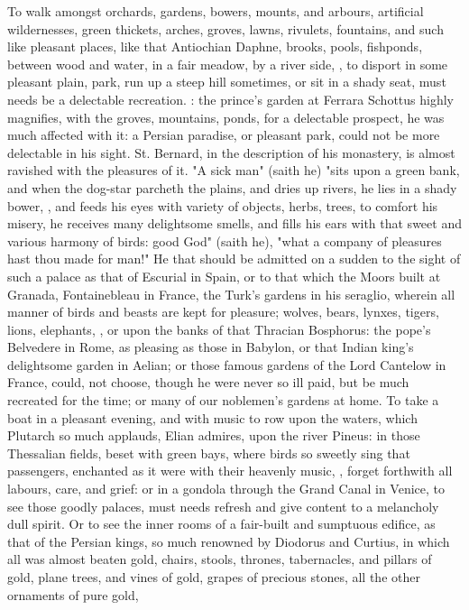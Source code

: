 {To walk amongst orchards, gardens, bowers, mounts, and arbours, artificial wildernesses, green thickets, arches, groves, lawns, rivulets, fountains, and such like pleasant places, like that Antiochian Daphne, brooks, pools, fishponds, between wood and water, in a fair meadow, by a river side, , \etc{} to disport in some pleasant plain, park, run up a steep hill sometimes, or sit in a shady seat, must needs be a delectable recreation. : the prince's garden at Ferrara Schottus highly magnifies, with the groves, mountains, ponds, for a delectable prospect, he was much affected with it: a Persian paradise, or pleasant park, could not be more delectable in his sight. St. Bernard, in the description of his monastery, is almost ravished with the pleasures of it. "A sick man" (saith he) "sits upon a green bank, and when the dog-star parcheth the plains, and dries up rivers, he lies in a shady bower, , and feeds his eyes with variety of objects, herbs, trees, to comfort his misery, he receives many delightsome smells, and fills his ears with that sweet and various harmony of birds: good God" (saith he), "what a company of pleasures hast thou made for man!" He that should be admitted on a sudden to the sight of such a palace as that of Escurial in Spain, or to that which the Moors built at Granada, Fontainebleau in France, the Turk's gardens in his seraglio, wherein all manner of birds and beasts are kept for pleasure; wolves, bears, lynxes, tigers, lions, elephants, \etc{}, or upon the banks of that Thracian Bosphorus: the pope's Belvedere in Rome, as pleasing as those  in Babylon, or that Indian king's delightsome garden in Aelian; or those famous gardens of the Lord Cantelow in France, could, not choose, though he were never so ill paid, but be much recreated for the time; or many of our noblemen's gardens at home. To take a boat in a pleasant evening, and with music to row upon the waters, which Plutarch so much applauds, Elian admires, upon the river Pineus: in those Thessalian fields, beset with green bays, where birds so sweetly sing that passengers, enchanted as it were with their heavenly music, , forget forthwith all labours, care, and grief: or in a gondola through the Grand Canal in Venice, to see those goodly palaces, must needs refresh and give content to a melancholy dull spirit. Or to see the inner rooms of a fair-built and sumptuous edifice, as that of the Persian kings, so much renowned by Diodorus and Curtius, in which all was almost beaten gold, chairs, stools, thrones, tabernacles, and pillars of gold, plane trees, and vines of gold, grapes of precious stones, all the other ornaments of pure gold,

}
